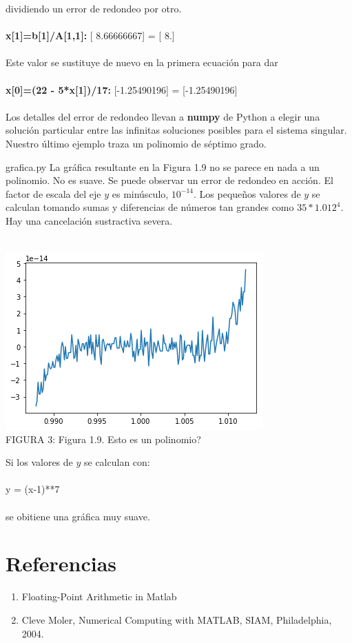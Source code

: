 \documentclass[12pt]{article}
\begin{document}
dividiendo un error de redondeo por otro.\\\\
\textbf{x[1]=b[1]/A[1,1]:} [ 8.66666667] = [ 8.]\\\\
Este valor se sustituye de nuevo en la primera ecuación para dar\\\\
\textbf{x[0]=(22 - 5*x[1])/17:} [-1.25490196] = [-1.25490196]\\\\
Los detalles del error de redondeo llevan a \textbf{numpy} de Python a elegir una solución particular entre las
infinitas soluciones posibles para el sistema singular. Nuestro último ejemplo traza un
polinomio de séptimo grado.

{grafica.py}
La gráfica resultante en la Figura 1.9 no se parece en nada a un polinomio. No es suave. Se puede observar un error de redondeo en acción. El factor de escala del eje $y$ es minúsculo, $10^{-14}$.
Los pequeños valores de $y$ se calculan tomando sumas y diferencias de números tan
grandes como $35*1.012^4$. Hay una cancelación sustractiva severa.\\\\
\begin{center}
  \includegraphics[scale=1]{grafica}\\
  FIGURA 3: Figura 1.9. Esto es un polinomio?\\
\end{center}
Si los valores de $y$ se calculan con:\\\\
y = (x-1)**7\\\\
se obitiene una gr\'afica muy suave.
\section*{Referencias}
\begin{enumerate}
\item Floating-Point Arithmetic in Matlab
\item Cleve Moler, Numerical Computing with MATLAB, SIAM, Philadelphia, 2004.
\end{enumerate}
\end{document}

